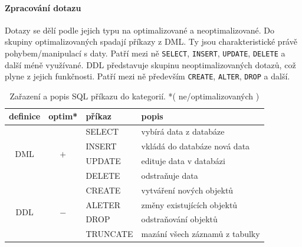 \documentclass[a4paper,12pt,oneside]{report}
\begin{document}
\paragraph*{Zpracování dotazu}
Dotazy se dělí podle jejich typu na optimalizované a
neoptimalizované. Do skupiny optimalizovaných spadají příkazy z
\ac{DML}. Ty jsou charakteristické právě pohybem/manipulací s
daty. Patří mezi ně \texttt{SELECT}, \texttt{INSERT}, \texttt{UPDATE},
\texttt{DELETE} a další méně využívané.    \acs{DDL} představuje skupinu
neoptimalizovaných dotazů, což plyne z jejich funkčnosti. Patří mezi
ně především \texttt{CREATE}, \texttt{ALTER}, \texttt{DROP} a
další. \cite{bares}


\begin{table}[h]
   \centering
\begin{tabular}{|ccll|}
\hline
definice & optim* & příkaz & popis \\ \hline \hline
\multirow{4}{*}{DML} & \multirow{4}{*}{$+$} & SELECT & vybírá data z databáze \\
 &  & INSERT & vkládá do databáze nová data \\
 &  & UPDATE & edituje data v databázi \\
 &  & DELETE & odstraňuje data \\ \hline
\multirow{4}{*}{DDL} & \multirow{4}{*}{$-$} & CREATE & vytváření nových objektů \\
 &  & ALETER & změny existujících objektů \\
 &  & DROP & odstraňování objektů \\
 &  & TRUNCATE & mazání všech záznamů z tabulky \\ \hline
\end{tabular}

\caption{Zařazení a popis SQL příkazu do kategorií.
*( ne/optimalizovaných )}
\label{tab:prikazy}
\end{table}
\end{document}
